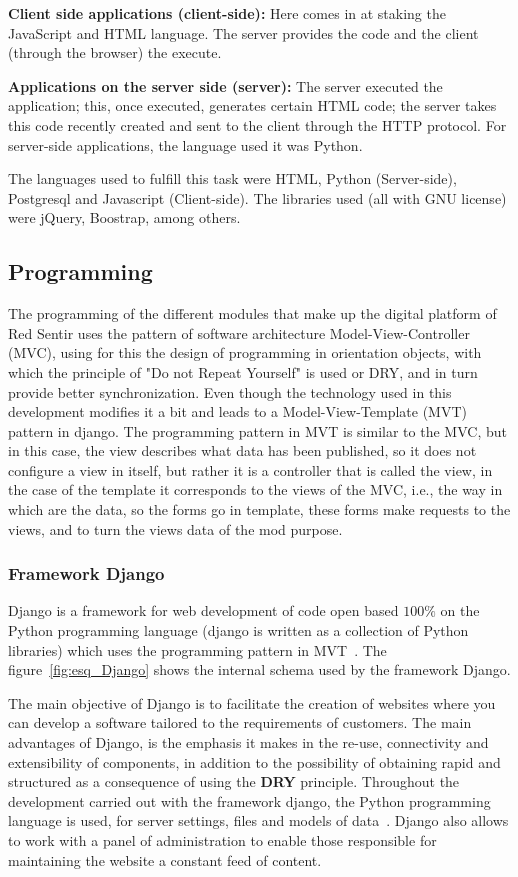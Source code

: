 \documentclass[journal,transmag]{IEEEtran}
\begin{document}
\textbf{Client side applications (client-side):} Here comes in at staking the JavaScript and HTML language. The server provides the code and the client (through the browser) the execute.

\textbf{Applications on the server side (server):} The server executed the application; this, once executed, generates certain HTML code; the server takes this code recently created and sent to the client through the HTTP protocol. For server-side applications, the language used it was Python.

The languages used to fulfill this task were HTML, Python (Server-side), Postgresql and Javascript (Client-side). The libraries used (all with GNU license) were jQuery, Boostrap, among others.

\subsection{Programming}
The programming of the different modules that make up the digital platform of Red Sentir uses the pattern of software architecture Model-View-Controller (MVC), using for this the design of programming in orientation objects, with which the principle of "Do not Repeat Yourself" is used or DRY, and in turn provide better synchronization. Even though the technology used in this development modifies it a bit and leads to a Model-View-Template (MVT) pattern in django. The programming pattern in MVT is similar to the MVC, but in this case, the view describes what data has been published, so it does not configure a view in itself, but rather it is a controller that is called the view, in the case of the template it corresponds to the views of the MVC, i.e., the way in which are the data, so the forms go in template, these forms make requests to the views, and to turn the views data of the mod purpose.

\subsubsection{Framework Django}
Django is a framework for web development of code open based $100\%$ on the Python programming language (django is written as a collection of Python libraries) which uses the programming pattern in MVT~\cite{Hol2009, DjangoM}. The figure~\ref{fig:esq_Django} shows the internal schema used by the framework Django. 

The main objective of Django is to facilitate the creation of websites where you can develop a software tailored to the requirements of customers. The main advantages of Django, is the emphasis it makes in the re-use, connectivity and extensibility of components, in addition to the possibility of obtaining rapid and structured as a consequence of using the \textbf{DRY} principle. Throughout the development carried out with the framework django, the Python programming language is used, for server settings, files and models of data~\cite{Wik2014}. Django also allows to work with a panel of administration to enable those responsible for maintaining the website a constant feed of content.
\end{document}
